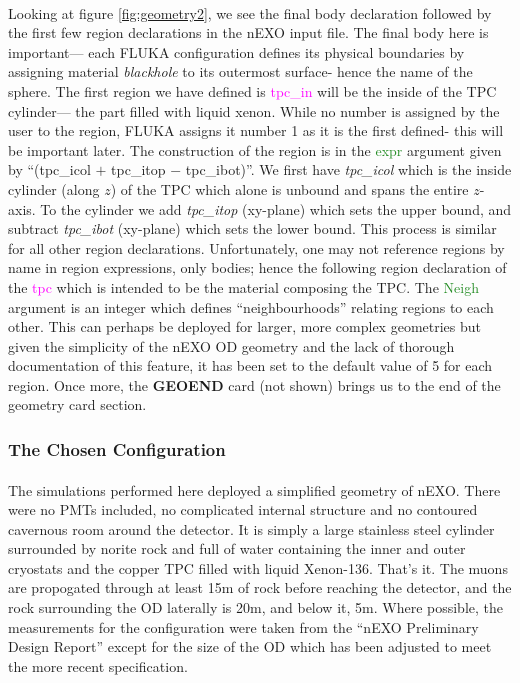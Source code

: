 \paragraph{}
Looking at figure \ref{fig:geometry2}, we see the final body declaration followed by the first few region declarations in the nEXO input file. The final body here is important— each FLUKA configuration defines its physical boundaries by assigning material \textit{blackhole} to its outermost surface- hence the name of the sphere. The first region we have defined is \textcolor{magenta}{tpc\_in} will be the inside of the TPC cylinder— the part filled with liquid xenon. While no number is assigned by the user to the region, FLUKA assigns it number 1 as it is the first defined- this will be important later. The construction of the region is in the \textcolor{ForestGreen}{expr} argument given by ``(tpc\_icol $+$ tpc\_itop $-$ tpc\_ibot)''. We first have \textit{tpc\_icol} which is the inside cylinder (along $z$) of the TPC which alone is unbound and spans the entire $z$-axis. To the cylinder we add \textit{tpc\_itop} (xy-plane) which sets the upper bound, and subtract \textit{tpc\_ibot} (xy-plane) which sets the lower bound. This process is similar for all other region declarations. Unfortunately, one may not reference regions by name in region expressions, only bodies; hence the following region declaration of the \textcolor{magenta}{tpc} which is intended to be the material composing the TPC. The \textcolor{ForestGreen}{Neigh} argument is an integer which defines ``neighbourhoods'' relating regions to each other. This can perhaps be deployed for larger, more complex geometries but given the simplicity of the nEXO OD geometry and the lack of thorough documentation of this feature, it has been set to the default value of 5 for each region. Once more, the \textbf{GEOEND} card (not shown) brings us to the end of the geometry card section.

\subsubsection{The Chosen Configuration}
\paragraph{}
The simulations performed here deployed a simplified geometry of nEXO. There were no PMTs included, no complicated internal structure and no contoured cavernous room around the detector. It is simply a large stainless steel cylinder surrounded by norite rock \cite{olivia_scallon} and full of water containing the inner and outer cryostats and the copper TPC filled with liquid Xenon-136. That's it. The muons are propogated through at least 15m of rock before reaching the detector, and the rock surrounding the OD laterally is 20m, and below it, 5m. Where possible, the measurements for the configuration were taken from the ``nEXO Preliminary Design Report'' except for the size of the OD which has been adjusted to meet the more recent specification.

